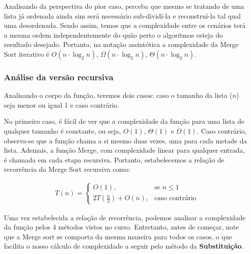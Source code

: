 Analisando da perspectiva do pior caso, perceba que mesmo se tratando de uma lista já ordenada ainda sim será necessário sub-dividí-la e reconstruí-la tal qual uma desordenada. Sendo assim, temos que a complexidade entre os cenários terá a mesma ordem independentemente do quão perto o algoritmos esteja do resultado desejado. Portanto, na notação assintótica a complexidade da Merge Sort iterativo é $O(n \cdot \log_2{n})$, $\Omega(n \cdot \log_2{n})$, $\Theta(n \cdot \log_2{n})$.

\subsubsection{Análise da versão recursiva}

Analisando o corpo da função, teremos dois casos: caso o tamanho da lista ($n$) seja menor ou igual 1 e caso contrário.

\begin{algorithm}
	\begin{algorithmic}[0]
		 \Return
		\EndIf
		\State {}
	\end{algorithmic}
\end{algorithm}
\FloatBarrier

No primeiro caso, é fácil de ver que a complexidade da função para uma lista de qualquer tamanho é constante, ou seja, $O(1)$, $\Theta(1)$ e $\Omega(1)$. Caso contrário, observa-se que a função chama a si mesmo duas vezes, uma para cada metade da lista. Ademais, a função Merge, com complexidade linear para qualquer entrada, é chamada em cada etapa recursiva. Portanto, estabelecemos a relação de recorrência da Merge Sort recursiva como:


\begin{align*}
	T(n) =
	\begin{cases}
		O(1),                   & \text{se $n \leq 1$}  \\
		2T(\frac{n}{2}) + O(n), & \text{caso contrário}
	\end{cases}
\end{align*}

Uma vez estabelecida a relação de recorrência, podemos analisar a complexidade da função pelos 4 métodos vistos no curso. Entretanto, antes de começar, note que a Merge sort se comporta da mesma maneira para todos os casos, o que facilita o nosso cálculo de complexidade a seguir pelo método da \textbf{Substituição}.

